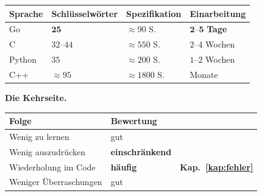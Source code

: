 \begin{aufgabe}
\begin{center}
{\small
\renewcommand{\arraystretch}{1.45}
\begin{tabular}{@{}P{2.0cm}P{2.2cm}P{2.2cm}P{2.4cm}@{}}
\toprule
\textbf{Sprache} & \textbf{Schlüssel\-wörter} & \textbf{Spezifi\-kation} & \textbf{Einarbeitung}\\
\midrule
Go & $\mathbf{25}$ & $\approx90$ S. & \textcolor{gruen}{$\mathbf{2}$--$\mathbf{5}$ \textbf{Tage}}\\
C & $32$--$44$ & $\approx550$ S. & $2$--$4$ Wochen\\
Python & $35$ & $\approx200$ S. & $1$--$2$ Wochen\\
C++ & $\approx95$ & \textcolor{akzent}{$\approx1800$ S.} & \textcolor{akzent}{Monate}\\
\bottomrule
\end{tabular}}
\end{center}

\begin{center}
\begin{minipage}{0.88\textwidth}
\end{minipage}
\end{center}

\textbf{Die Kehrseite.}

\begin{center}
\renewcommand{\arraystretch}{1.5}
\begin{tabular}{@{}P{3.4cm}P{2.4cm}P{2.4cm}@{}}
\toprule
\textbf{Folge} & \textbf{Bewertung} & \\
\midrule
Wenig zu lernen & \textcolor{gruen}{gut} & \\
Wenig auszudrücken & \textcolor{akzent}{\textbf{einschrän\-kend}} & \\
Wiederholung im Code & \textcolor{akzent}{\textbf{häufig}} & \textbf{Kap.~\ref{kap:fehler}}\\
Weniger Überraschungen & \textcolor{gruen}{gut} & \\
\bottomrule
\end{tabular}
\end{center}

\begin{center}
\end{center}


\end{aufgabe}
